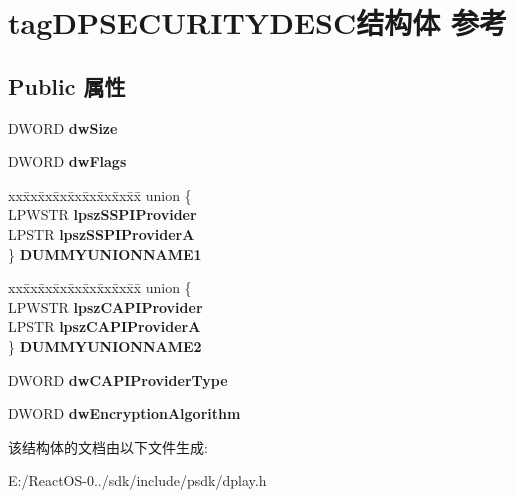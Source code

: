 \hypertarget{structtag_d_p_s_e_c_u_r_i_t_y_d_e_s_c}{}\section{tag\+D\+P\+S\+E\+C\+U\+R\+I\+T\+Y\+D\+E\+S\+C结构体 参考}
\label{structtag_d_p_s_e_c_u_r_i_t_y_d_e_s_c}
\subsection*{Public 属性}
\begin{DoxyCompactItemize}
\item 
\mbox{\label{structtag_d_p_s_e_c_u_r_i_t_y_d_e_s_c_aca401d21acd922b5fc437f6732162b12}} 
D\+W\+O\+RD {\bfseries dw\+Size}
\item 
\mbox{\label{structtag_d_p_s_e_c_u_r_i_t_y_d_e_s_c_a013204c9621a97e1420e16d5e3d415c6}} 
D\+W\+O\+RD {\bfseries dw\+Flags}
\item 
\mbox{\label{structtag_d_p_s_e_c_u_r_i_t_y_d_e_s_c_a3bf998a4d59499577c88ebd4c7f7a8f5}} 
\begin{tabbing}
xx\=xx\=xx\=xx\=xx\=xx\=xx\=xx\=xx\=\kill
union \{\\
\>LPWSTR {\bfseries lpszSSPIProvider}\\
\>LPSTR {\bfseries lpszSSPIProviderA}\\
\} {\bfseries DUMMYUNIONNAME1}\\

\end{tabbing}\item 
\mbox{\label{structtag_d_p_s_e_c_u_r_i_t_y_d_e_s_c_adf8775d56318b344af83362d7741f6a1}} 
\begin{tabbing}
xx\=xx\=xx\=xx\=xx\=xx\=xx\=xx\=xx\=\kill
union \{\\
\>LPWSTR {\bfseries lpszCAPIProvider}\\
\>LPSTR {\bfseries lpszCAPIProviderA}\\
\} {\bfseries DUMMYUNIONNAME2}\\

\end{tabbing}\item 
\mbox{\label{structtag_d_p_s_e_c_u_r_i_t_y_d_e_s_c_a29b2ae10d93dcebb52e97f6aaa216aea}} 
D\+W\+O\+RD {\bfseries dw\+C\+A\+P\+I\+Provider\+Type}
\item 
\mbox{\label{structtag_d_p_s_e_c_u_r_i_t_y_d_e_s_c_a56c4a9c68826b0214603a3edf783ffbb}} 
D\+W\+O\+RD {\bfseries dw\+Encryption\+Algorithm}
\end{DoxyCompactItemize}


该结构体的文档由以下文件生成\+:\begin{DoxyCompactItemize}
\item 
E\+:/\+React\+O\+S-\/0../sdk/include/psdk/dplay.\+h\end{DoxyCompactItemize}
